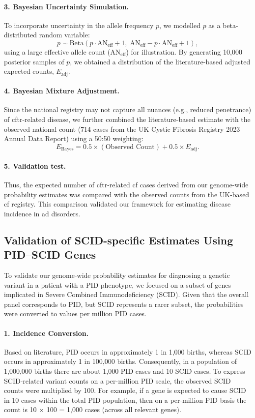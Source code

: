 \paragraph{3. Bayesian Uncertainty Simulation.}
To incorporate uncertainty in the allele frequency \( p \), we modelled \( p \) as a beta-distributed random variable:
\[
p \sim \mathrm{Beta}(p \cdot \text{AN}_{\text{eff}} + 1,\; \text{AN}_{\text{eff}} - p \cdot \text{AN}_{\text{eff}} + 1),
\]
using a large effective allele count (\(\text{AN}_{\text{eff}}\)) for illustration. By generating 10,000 posterior samples of \( p \), we obtained a distribution of the literature-based adjusted expected counts, \(E_{\text{adj}}\).

\paragraph{4. Bayesian Mixture Adjustment.}
Since the national registry may not capture all nuances (e.g., reduced penetrance) of \ac{cftr}-related disease, we further combined the literature-based estimate with the observed national count (714 cases from the UK Cystic Fibrosis Registry 2023 Annual Data Report) using a 50:50 weighting:
\[
E_{\text{Bayes}} = 0.5 \times (\text{Observed Count}) + 0.5 \times E_{\text{adj}}.
\]

\paragraph{5. Validation test.}
Thus, the expected number of \ac{cftr}-related \ac{cf} cases derived from our genome-wide probability estimates was compared with the observed counts from the UK-based \ac{cf} registry. This comparison validated our framework for estimating disease incidence in \ac{ad} disorders.


\subsection{Validation of SCID-specific Estimates Using PID–SCID Genes}

To validate our genome-wide probability estimates for diagnosing a genetic variant in a patient with a PID phenotype, we focused on a subset of genes implicated in Severe Combined Immunodeficiency (SCID). Given that the overall panel corresponds to PID, but SCID represents a rarer subset, the probabilities were converted to values per million PID cases.

\paragraph{1. Incidence Conversion.}
Based on literature, PID occurs in approximately 1 in 1,000 births, whereas SCID occurs in approximately 1 in 100,000 births. Consequently, in a population of 1,000,000 births there are about 1,000 PID cases and 10 SCID cases. To express SCID-related variant counts on a per-million PID scale, the observed SCID counts were multiplied by 100. For example, if a gene is expected to cause SCID in 10 cases within the total PID population, then on a per-million PID basis the count is 10 × 100 = 1,000 cases (across all relevant genes).


